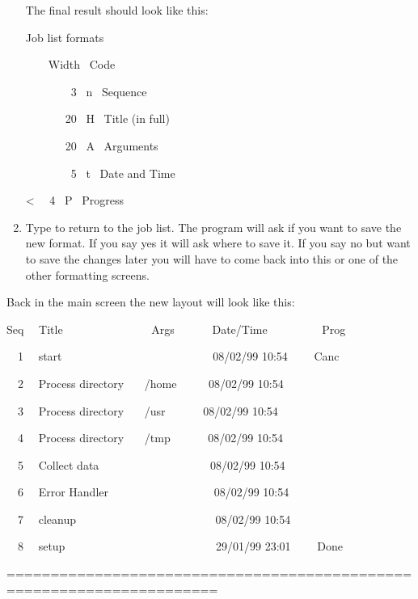 \begin{enumerate}
The final result should look like this:

\begin{expara}

Job list formats

\ \ \ \ Width \ Code

\ \ \ \ \ \ \ \ 3 \ n \ Sequence

{\textquotedbl} {\textquotedbl}

\ \ \ \ \ \ \ 20 \ H \ Title (in full)

{\textquotedbl} {\textquotedbl}

\ \ \ \ \ \ \ 20 \ A \ Arguments

{\textquotedbl} {\textquotedbl}

\ \ \ \ \ \ \ \ 5 \ t \ Date and Time

{\textquotedbl} {\textquotedbl} {\textless} \ \ 4 \ P \ Progress

\end{expara}

\item Type  to return to the job list. The
program will ask if you want to save the new format. If you say yes it
will ask where to save it. If you say no but want to save the changes
later you will have to come back into this or one of the other
formatting screens.
\end{enumerate}

Back in the main screen the new layout will look like this:

\begin{exparasmall}

Seq \ \ Title \ \ \ \ \ \ \ \ \ \ \ \ \ \ \ Args \ \ \ \ \ \ Date/Time
\ \ \ \ \ \ \ \ \ Prog

\ \ 1 \ \ start
\ \ \ \ \ \ \ \ \ \ \ \ \ \ \ \ \ \ \ \ \ \ \ \ \ \ 08/02/99 10:54
\ \ \ \ Canc

\ \ 2 \ \ Process directory \ \ \ /home \ \ \ \ \ 08/02/99 10:54

\ \ 3 \ \ Process directory \ \ \ /usr \ \ \ \ \ \ 08/02/99 10:54

\ \ 4 \ \ Process directory \ \ \ /tmp \ \ \ \ \ \ 08/02/99 10:54

\ \ 5 \ \ Collect data \ \ \ \ \ \ \ \ \ \ \ \ \ \ \ \ \ \ \ 08/02/99
10:54

\ \ 6 \ \ Error Handler \ \ \ \ \ \ \ \ \ \ \ \ \ \ \ \ \ \ 08/02/99
10:54

\ \ 7 \ \ cleanup
\ \ \ \ \ \ \ \ \ \ \ \ \ \ \ \ \ \ \ \ \ \ \ \ 08/02/99 10:54

\ \ 8 \ \ setup
\ \ \ \ \ \ \ \ \ \ \ \ \ \ \ \ \ \ \ \ \ \ \ \ \ \ 29/01/99 23:01
\ \ \ \ Done

\bigskip

======================================================================

\end{exparasmall}

